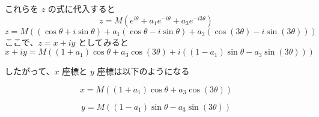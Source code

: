 \documentclass[a4paper, 11pt]{bxjsarticle}
\begin{document}
これらを $z$ の式に代入すると
\begin{equation}
    z = M\left(e^{i\theta} + a_1 e^{-i\theta} + a_3 e^{-i3\theta}\right)
\end{equation}
\begin{equation}
    z = M\left((\cos\theta + i\sin\theta) + a_1(\cos\theta - i\sin\theta) + a_3(\cos(3\theta) - i\sin(3\theta))\right)
\end{equation}
ここで、$z = x + iy$ としてみると
\begin{equation}
    x + iy = M\left((1+a_1)\cos\theta + a_3\cos(3\theta) + i((1-a_1)\sin\theta - a_3\sin(3\theta))\right)
\end{equation}

したがって、$x$ 座標と $y$ 座標は以下のようになる

$$x = M\left((1+a_1)\cos\theta + a_3\cos(3\theta)\right)$$

$$y = M\left((1-a_1)\sin\theta - a_3\sin(3\theta)\right)$$


\end{document}
